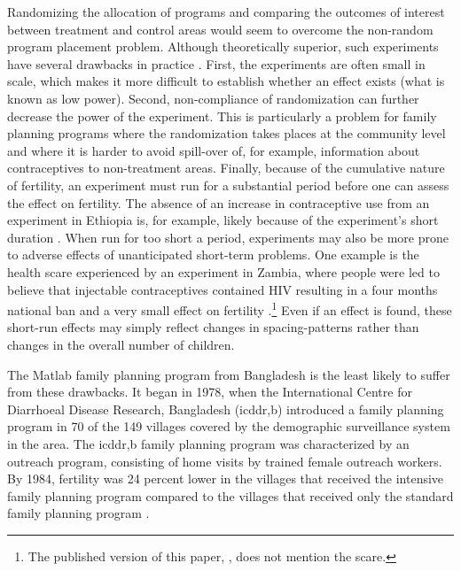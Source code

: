 Randomizing the allocation of programs and comparing the outcomes of interest between treatment and control areas would seem to overcome the non-random program placement problem. Although theoretically superior, such experiments have several drawbacks in practice \citep{Portner2011}. First, the experiments are often small in scale, which makes it more difficult to establish whether an effect exists (what is known as low power). Second, non-compliance of randomization can further decrease the power of the experiment. This is particularly a problem for family planning programs where the randomization takes places at the community level and where it is harder to avoid spill-over of, for example, information about contraceptives to non-treatment areas. Finally, because of the cumulative nature of fertility, an experiment must run for a substantial period before one can assess the effect on fertility. The absence of an increase in contraceptive use from an experiment in Ethiopia is, for example, likely because of the experiment's short duration \citep{Desai2011}. When run for too short a period, experiments may also be more prone to adverse effects of unanticipated short-term problems. One example is the health scare experienced by an experiment in Zambia, where people were led to believe that injectable contraceptives contained HIV resulting in a four months national ban and a very small effect on fertility \citep{Ashraf2009}.\footnote{The published version of this paper, \citet{Ashraf2014}, does not mention the scare.} Even if an effect is found, these short-run effects may simply reflect changes in spacing-patterns rather than changes in the overall number of children.

The Matlab family planning program from Bangladesh is the least likely to suffer from these drawbacks. It began in 1978, when the International Centre for Diarrhoeal Disease Research, Bangladesh (icddr,b) introduced a family planning program in 70 of the 149 villages covered by the demographic surveillance system in the area. The icddr,b family planning program was characterized by an outreach program, consisting of home visits by trained female outreach workers. By 1984, fertility was 24 percent lower in the villages that received the intensive family planning program compared to the villages that received only the standard family planning program \citep{Phillips1988}.

